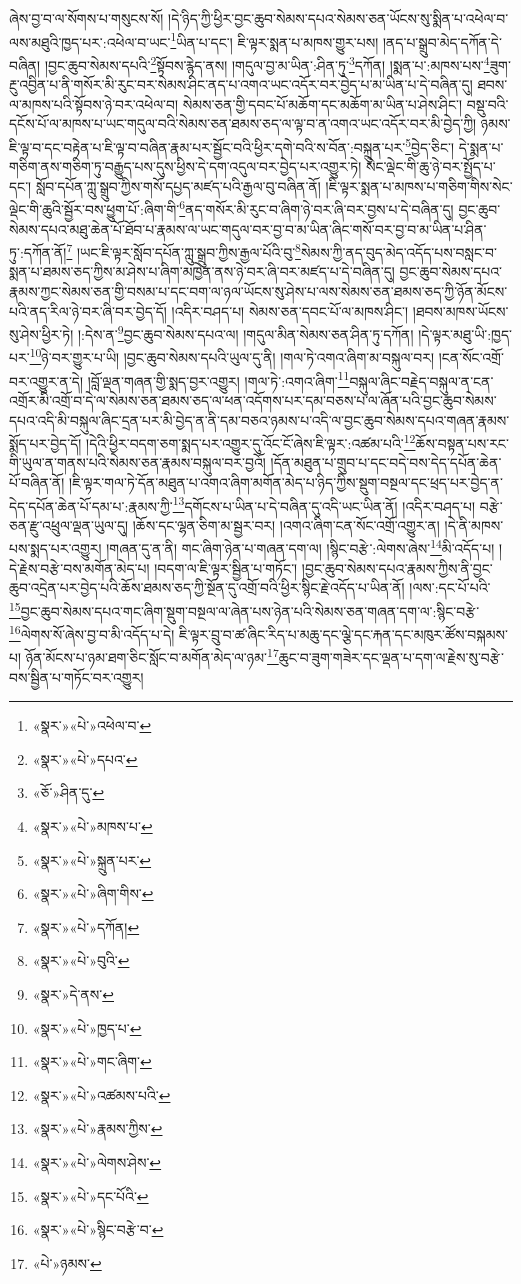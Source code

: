 ཞེས་བྱ་བ་ལ་སོགས་པ་གསུངས་སོ། །དེ་ཉིད་ཀྱི་ཕྱིར་བྱང་ཆུབ་སེམས་དཔའ་སེམས་ཅན་ཡོངས་སུ་སྨིན་པ་འཕེལ་བ་ལས་མཐུའི་ཁྱད་པར་:འཕེལ་བ་ཡང་\footnote{«སྣར་»«པེ་»འཕེལ་བ་}ཡིན་པ་དང་། ཇི་ལྟར་སྨན་པ་མཁས་གྱུར་པས། །ནད་པ་སྒྲུབ་མེད་དཀོན་དེ་བཞིན། །བྱང་ཆུབ་སེམས་དཔའི་\footnote{«སྣར་»«པེ་»དཔའ་}སྟོབས་རྙེད་ནས། །གདུལ་བྱ་མ་ཡིན་:ཤིན་ཏུ་\footnote{«ཅོ་»ཤིན་དུ་}དཀོན། །སྨན་པ་:མཁས་པས་\footnote{«སྣར་»«པེ་»མཁས་པ་}ཟུག་རྔུ་འབྱིན་པ་ནི་གསོར་མི་རུང་བར་སེམས་ཤིང་ནད་པ་འགའ་ཡང་འདོར་བར་བྱེད་པ་མ་ཡིན་པ་དེ་བཞིན་དུ། ཐབས་ལ་མཁས་པའི་སྟོབས་ཉེ་བར་འཕེལ་བ། སེམས་ཅན་གྱི་དབང་པོ་མཆོག་དང་མཆོག་མ་ཡིན་པ་ཤེས་ཤིང་། བསྡུ་བའི་དངོས་པོ་ལ་མཁས་པ་ཡང་གདུལ་བའི་སེམས་ཅན་ཐམས་ཅད་ལ་ལྟ་བ་ན་འགའ་ཡང་འདོར་བར་མི་བྱེད་ཀྱི། ཉམས་ཇི་ལྟ་བ་དང་བརྟེན་པ་ཇི་ལྟ་བ་བཞིན་རྣམ་པར་སྦྱོང་བའི་ཕྱིར་དགེ་བའི་ས་བོན་:བསྐྲུན་པར་\footnote{«སྣར་»«པེ་»སྐྲུན་པར་}བྱེད་ཅིང་། དེ་སྨན་པ་གཅིག་ནས་གཅིག་ཏུ་བརྒྱུད་པས་དུས་ཕྱིས་དེ་དག་འདུལ་བར་བྱེད་པར་འགྱུར་ཏེ། སེང་ལྡེང་གི་ཆུ་ཉེ་བར་སྤྱོད་པ་དང་། སློབ་དཔོན་ཀླུ་སྒྲུབ་ཀྱིས་གསོ་དཔྱད་མཛད་པའི་རྒྱལ་བུ་བཞིན་ནོ། །ཇི་ལྟར་སྨན་པ་མཁས་པ་གཅིག་གིས་སེང་ལྡེང་གི་ཆུའི་སྦྱོར་བས་ཕྱུག་པོ་:ཞིག་གི་\footnote{«སྣར་»«པེ་»ཞིག་གིས་}ནད་གསོར་མི་རུང་བ་ཞིག་ཉེ་བར་ཞི་བར་བྱས་པ་དེ་བཞིན་དུ། བྱང་ཆུབ་སེམས་དཔའ་མཐུ་ཆེན་པོ་ཐོབ་པ་རྣམས་ལ་ཡང་གདུལ་བར་བྱ་བ་མ་ཡིན་ཞིང་གསོ་བར་བྱ་བ་མ་ཡིན་པ་ཤིན་ཏུ་:དཀོན་ནོ།\footnote{«སྣར་»«པེ་»དཀོན།} །ཡང་ཇི་ལྟར་སློབ་དཔོན་ཀླུ་སྒྲུབ་ཀྱིས་རྒྱལ་པོའི་བུ་\footnote{«སྣར་»«པེ་»བུའི་}སེམས་ཀྱི་ནད་བུད་མེད་འདོད་པས་བསླང་བ་སྨན་པ་ཐམས་ཅད་ཀྱིས་མ་ཤེས་པ་ཞིག་མཁྱེན་ནས་ཉེ་བར་ཞི་བར་མཛད་པ་དེ་བཞིན་དུ། བྱང་ཆུབ་སེམས་དཔའ་རྣམས་ཀྱང་སེམས་ཅན་གྱི་བསམ་པ་དང་བག་ལ་ཉལ་ཡོངས་སུ་ཤེས་པ་ལས་སེམས་ཅན་ཐམས་ཅད་ཀྱི་ཉོན་མོངས་པའི་ནད་རིལ་ཉེ་བར་ཞི་བར་བྱེད་དོ། །འདིར་བཤད་པ། སེམས་ཅན་དབང་པོ་ལ་མཁས་ཤིང་། །ཐབས་མཁས་ཡོངས་སུ་ཤེས་ཕྱིར་ཏེ། །:དེས་ན་\footnote{«སྣར་»དེ་ནས་}བྱང་ཆུབ་སེམས་དཔའ་ལ། །གདུལ་མིན་སེམས་ཅན་ཤིན་ཏུ་དཀོན། །དེ་ལྟར་མཐུ་ཡི་:ཁྱད་པར་\footnote{«སྣར་»«པེ་»ཁྱད་པ་}ཉེ་བར་གྱུར་པ་ཡི། །བྱང་ཆུབ་སེམས་དཔའི་ཡུལ་དུ་ནི། །གལ་ཏེ་འགའ་ཞིག་མ་བསྐུལ་བར། །ངན་སོང་འགྲོ་བར་འགྱུར་ན་དེ། །བློ་ལྡན་གཞན་གྱི་སྨད་བྱར་འགྱུར། །གལ་ཏེ་:འགའ་ཞིག་\footnote{«སྣར་»«པེ་»གང་ཞིག་}བསྐུལ་ཞིང་བརྗེད་བསྐུལ་ན་ངན་འགྲོར་མི་འགྲོ་བ་དེ་ལ་སེམས་ཅན་ཐམས་ཅད་ལ་ཕན་འདོགས་པར་དམ་བཅས་པ་ལ་ཞོན་པའི་བྱང་ཆུབ་སེམས་དཔའ་འདི་མི་བསྐུལ་ཞིང་དྲན་པར་མི་བྱེད་ན་ནི་དམ་བཅའ་ཉམས་པ་འདི་ལ་བྱང་ཆུབ་སེམས་དཔའ་གཞན་རྣམས་སྨོད་པར་བྱེད་དོ། །དེའི་ཕྱིར་བདག་ཅག་སྨད་པར་འགྱུར་དུ་འོང་ངོ་ཞེས་ཇི་ལྟར་:འཚམ་པའི་\footnote{«སྣར་»«པེ་»འཚམས་པའི་}ཆོས་བསྟན་པས་རང་གི་ཡུལ་ན་གནས་པའི་སེམས་ཅན་རྣམས་བསྐུལ་བར་བྱའོ། །དོན་མཐུན་པ་གྲུབ་པ་དང་བདེ་བས་དེད་དཔོན་ཆེན་པོ་བཞིན་ནོ། །ཇི་ལྟར་གལ་ཏེ་དོན་མཐུན་པ་འགའ་ཞིག་མགོན་མེད་པ་ཉིད་ཀྱིས་སྡུག་བསྔལ་དང་ཕྲད་པར་བྱེད་ན་དེད་དཔོན་ཆེན་པོ་དམ་པ་:རྣམས་ཀྱི་\footnote{«སྣར་»«པེ་»རྣམས་ཀྱིས་}དགོངས་པ་ཡིན་པ་དེ་བཞིན་དུ་འདི་ཡང་ཡིན་ནོ། །འདིར་བཤད་པ། བརྩེ་ཅན་རྫུ་འཕྲུལ་ལྡན་ཡུལ་དུ། །ཆོས་དང་ལྷན་ཅིག་མ་སྦྱར་བར། །འགའ་ཞིག་ངན་སོང་འགྲོ་འགྱུར་ན། །དེ་ནི་མཁས་པས་སྨད་པར་འགྱུར། །གཞན་དུ་ན་ནི། གང་ཞིག་ཉེན་པ་གཞན་དག་ལ། །སྙིང་བརྩེ་:ལེགས་ཞེས་\footnote{«སྣར་»«པེ་»ལེགས་ཤེས་}མི་འདོད་པ། །དེ་རྗེས་བརྩེ་བས་མགོན་མེད་པ། །བདག་ལ་ཇི་ལྟར་སྦྱིན་པ་གཏོང་། །བྱང་ཆུབ་སེམས་དཔའ་རྣམས་ཀྱིས་ནི་བྱང་ཆུབ་འདྲེན་པར་བྱེད་པའི་ཆོས་ཐམས་ཅད་ཀྱི་སྔོན་དུ་འགྲོ་བའི་ཕྱིར་སྙིང་རྗེ་འདོད་པ་ཡིན་ནོ། །ལས་:དང་པོ་པའི་\footnote{«སྣར་»«པེ་»དང་པོའི་}བྱང་ཆུབ་སེམས་དཔའ་གང་ཞིག་སྡུག་བསྔལ་ལ་ཞེན་པས་ཉེན་པའི་སེམས་ཅན་གཞན་དག་ལ་:སྙིང་བརྩེ་\footnote{«སྣར་»«པེ་»སྙིང་བརྩེ་བ་}ལེགས་སོ་ཞེས་བྱ་བ་མི་འདོད་པ་དེ། ཇི་ལྟར་བྲུ་བ་ཚ་ཞིང་རིད་པ་མཆུ་དང་ལྕེ་དང་རྐན་དང་མཁུར་ཚོས་བསྐམས་པ། ཉོན་མོངས་པ་ཉམ་ཐག་ཅིང་སློང་བ་མགོན་མེད་ལ་ཉམ་\footnote{«པེ་»ཉམས་}ཆུང་བ་ཟུག་གཟེར་དང་ལྡན་པ་དག་ལ་རྗེས་སུ་བརྩེ་བས་སྦྱིན་པ་གཏོང་བར་འགྱུར། 